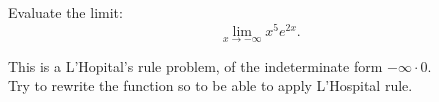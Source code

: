 \documentclass{ximera}
\author{Emma Smith Zbarsky\and Nela Lakos}
\begin{document}
\begin{exercise}

Evaluate the limit: \[\lim_{x \to -\infty} x^5e^{2x}.\]


\begin{hint}
This is a L'Hopital's rule problem, of the indeterminate form
$-\infty \cdot 0.$\\
Try to rewrite the function so to be able to apply L'Hospital rule. 
\end{hint}


\begin{multipleChoice}
\choice{$\infty$}
\choice{$-\infty$}
\end{multipleChoice}

\end{exercise}
\end{document}
